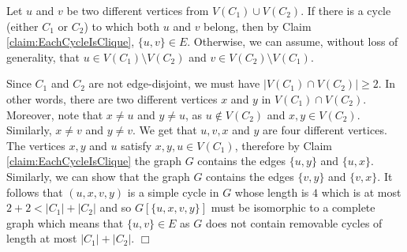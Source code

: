 \documentclass{article}
\theoremstyle{definition}
\newenvironment{proofof}[1]{\noindent {\em Proof of #1.  }}{\hfill$\Box$}
\begin{document}
\begin{proofof}{Lemma~\ref{lem:edgeDisCycles}} Let $u$ and $v$ be two different vertices from $V(C_{1}) \cup V(C_{2})$. If there is a cycle (either $C_1$ or $C_2$) to which both $u$ and $v$ belong, then by Claim \ref{claim:EachCycleIsClique}, $\{u,v\} \in E$. Otherwise, we can assume, without loss of generality, that $u \in V(C_{1}) \setminus V(C_{2})$ and $v \in V(C_{2}) \setminus V(C_{1})$.

Since $C_1$ and $C_2$ are not edge-disjoint, we must have $|V(C_1) \cap V(C_2)|\ge 2$. In other words, there are two different vertices $x$ and $y$ in $V(C_1) \cap V(C_2)$.
Moreover, note that $x \neq u$ and $y \neq u$, as $u \notin V(C_{2})$ and $x,y \in V(C_{2})$.
Similarly, $x \neq v$ and $y \neq v$.
We get that $u,v,x$ and $y$ are four different vertices.
The vertices $x,y$ and $u$ satisfy $x,y,u \in V(C_1)$, therefore by Claim \ref{claim:EachCycleIsClique} the graph $G$ contains the edges $\{u,y\}$ and $\{u,x\}$.
Similarly, we can show that the graph $G$ contains the edges $\{v,y\}$ and $\{v,x\}$. It follows that $(u,x,v,y)$ is a simple cycle in $G$ whose length is $4$ which is at most $2 + 2 < |C_{1}| + |C_{2}|$ and so $G[\{u,x,v,y\}]$ must be isomorphic to a complete graph which means that $\{u,v\} \in E$ as $G$ does not contain removable cycles of length at most $|C_{1}| + |C_{2}|$.
%
\end{proofof}
\end{document}
